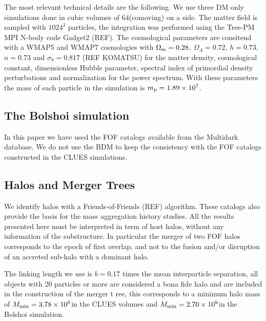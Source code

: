 \documentclass[usenatbib]{mn2e}
\newcommand{\hMpc}{{\ifmmode{h^{-1}{\rm Mpc}}\else{$h^{-1}$Mpc }\fi}}
\newcommand{\hMsun}{{\ifmmode{h^{-1}{\rm {M_{\odot}}}}\else{$h^{-1}{\rm{M_{\odot}}}$}\fi}}
\begin{document}
The most relevant technical details are the following. We use three DM only simulations done in cubic 
volumes of $64$\hMpc (comoving) on a side. The matter field is sampled with $1024^3$ particles, the 
integration was performed using the Tree-PM MPI N-body code Gadget2 (REF). The cosmological parameters 
are consitend with a WMAP5 and WMAP7 cosmologies with $\Omega_{\rm m}=0.28$, $\Omega_{\Lambda}=0.72$, 
$h=0.73$, $n=0.73$ and $\sigma_{8}=0.817$ (REF KOMATSU) for the matter density, cosmological constant, 
dimensionless Hubble parameter, spectral index of primordial density perturbations and normalization for
the power spectrum. With these parameters the mass of each particle in the simulation is 
$m_{\rm p}=1.89\times 10^{7}$\hMsun.

\subsection{The Bolshoi simulation}
\label{subsec:Bolshoi_simulation}

In this paper we have used the FOF catalogs available from the Multidark database. We do not use the 
BDM to keep the consistency with the FOF catalogs constructed in the CLUES simulations. 

\subsection{Halos and Merger Trees}
\label{subsec:halos_merger_trees}

We identify halos with a Friends-of-Friends (REF) algorithm. These catalogs also provide the basis for
the mass aggregation history studies. All the results presented here must be interpreted in term of
host halos, without any information of the substructure. In particular the merger of two FOF halos 
corresponds to the epoch of first overlap, and not to the fusion and/or disruption of an accreted 
sub-halo with a dominant halo. 

The linking length we use is $b=0.17$ times the mean interparticle separation, all objects with 20 
particles or more are considered a bona fide halo and are included in the construction of the merger t
ree, this corresponds to a minimum halo mass of $M_{\rm min}=3.78\times 10^{8}$\hMsun in the CLUES 
volumes and $M_{\rm min}=2.70\times 10^{9}$\hMsun in the Bolshoi simulation. 
\end{document}
